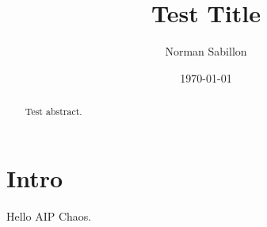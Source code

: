 \documentclass[aip,cha,reprint,amsmath,amssymb]{revtex4-2}
\begin{document}
\title{Test Title}
\author{Norman Sabillon}
\date{\today}
\begin{abstract}Test abstract.\end{abstract}
\maketitle
\section{Intro}
Hello AIP Chaos.
\end{document}
